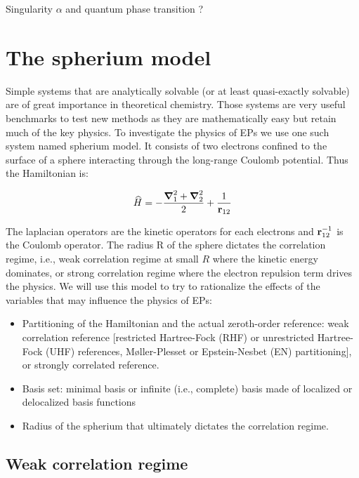 \documentclass[11pt,a4paper]{article}
\begin{document}
Singularity $\alpha$ and quantum phase transition ?

\section{The spherium model}

Simple systems that are analytically solvable (or at least quasi-exactly solvable) are of great importance in theoretical chemistry. Those systems are very useful benchmarks to test new methods as they are mathematically easy but retain much of the key physics. To investigate the physics of EPs we use one such system named spherium model. It consists of two electrons confined to the surface of a sphere interacting through the long-range Coulomb potential. Thus the Hamiltonian is:

\begin{equation}
\widehat{H} = -\frac{\grad_1^2 + \grad_2^2}{2} + \frac{1}{\vb{r}_{12}}
\end{equation}

The laplacian operators are the kinetic operators for each electrons and $\vb{r}_{12}^{-1}$ is the Coulomb operator. The radius R of the sphere dictates the correlation regime, i.e., weak correlation regime at small $R$ where the kinetic energy dominates, or strong correlation regime where the electron repulsion term drives the physics. We will use this model to try to rationalize the effects of the variables that may influence the physics of EPs:
\begin{itemize}
	\item Partitioning of the Hamiltonian and the actual zeroth-order reference: weak correlation reference [restricted Hartree-Fock (RHF) or unrestricted Hartree-Fock (UHF) references, M{\o}ller-Plesset or Epstein-Nesbet (EN) partitioning], or strongly correlated reference.
	\item Basis set: minimal basis or infinite (i.e., complete) basis made of localized or delocalized basis functions
	\item Radius of the spherium that ultimately dictates the correlation regime.
\end{itemize}

\subsection{Weak correlation regime}
\end{document}
